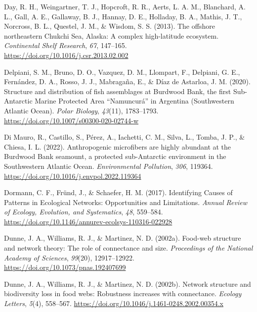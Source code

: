 \documentclass[preprint, 3p,
authoryear]{elsarticle} %
\newlength{\cslhangindent}
\newlength{\cslentryspacingunit} %
\newenvironment{CSLReferences}[2] %
 {%
  \setlength{\parindent}{0pt}
  \ifodd #1
  \let\oldpar\par
  \def\par{\hangindent=\cslhangindent\oldpar}
  \fi
  \setlength{\parskip}{#2\cslentryspacingunit}
 }%
 {}
\begin{document}
\begin{CSLReferences}{1}{0}
\leavevmode{}%
Day, R. H., Weingartner, T. J., Hopcroft, R. R., Aerts, L. A. M.,
Blanchard, A. L., Gall, A. E., Gallaway, B. J., Hannay, D. E., Holladay,
B. A., Mathis, J. T., Norcross, B. L., Questel, J. M., \& Wisdom, S. S.
(2013). The offshore northeastern {Chukchi Sea}, {Alaska}: {A} complex
high-latitude ecosystem. \emph{Continental Shelf Research}, \emph{67},
147--165. \url{https://doi.org/10.1016/j.csr.2013.02.002}

\leavevmode{}%
Delpiani, S. M., Bruno, D. O., Vazquez, D. M., Llompart, F., Delpiani,
G. E., Fernández, D. A., Rosso, J. J., Mabragaña, E., \& Díaz de
Astarloa, J. M. (2020). Structure and distribution of fish assemblages
at {Burdwood Bank}, the first {Sub-Antarctic Marine Protected Area}
{``{Namuncurá}''} in {Argentina} ({Southwestern Atlantic Ocean}).
\emph{Polar Biology}, \emph{43}(11), 1783--1793.
\url{https://doi.org/10.1007/s00300-020-02744-w}

\leavevmode{}%
Di Mauro, R., Castillo, S., Pérez, A., Iachetti, C. M., Silva, L.,
Tomba, J. P., \& Chiesa, I. L. (2022). Anthropogenic microfibers are
highly abundant at the {Burdwood Bank} seamount, a protected
sub-{Antarctic} environment in the {Southwestern Atlantic Ocean}.
\emph{Environmental Pollution}, \emph{306}, 119364.
\url{https://doi.org/10.1016/j.envpol.2022.119364}

\leavevmode{}%
Dormann, C. F., Fründ, J., \& Schaefer, H. M. (2017). Identifying
{Causes} of {Patterns} in {Ecological Networks}: {Opportunities} and
{Limitations}. \emph{Annual Review of Ecology, Evolution, and
Systematics}, \emph{48}, 559--584.
\url{https://doi.org/10.1146/annurev-ecolsys-110316-022928}

\leavevmode{}%
Dunne, J. A., Williams, R. J., \& Martinez, N. D. (2002a). Food-web
structure and network theory: {The} role of connectance and size.
\emph{Proceedings of the National Academy of Sciences}, \emph{99}(20),
12917--12922. \url{https://doi.org/10.1073/pnas.192407699}

\leavevmode{}%
Dunne, J. A., Williams, R. J., \& Martinez, N. D. (2002b). Network
structure and biodiversity loss in food webs: Robustness increases with
connectance. \emph{Ecology Letters}, \emph{5}(4), 558--567.
\url{https://doi.org/10.1046/j.1461-0248.2002.00354.x}


\end{CSLReferences}
\end{document}
